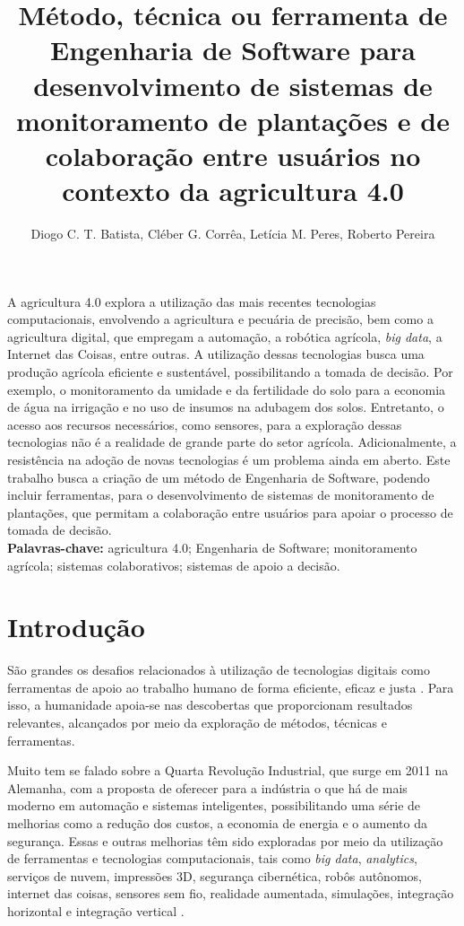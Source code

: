 \documentclass[12pt]{article}
\title{Método, técnica ou ferramenta de Engenharia de Software para desenvolvimento de sistemas de monitoramento de plantações e de colaboração entre usuários no contexto da agricultura 4.0}
\author{Diogo C. T. Batista\inst{1}, Cléber G. Corrêa\inst{2}, Letícia M. Peres\inst{1}, Roberto Pereira\inst{1}}
\begin{document}
 

\maketitle
     
\begin{resumo} 
A agricultura 4.0 explora a utilização das mais recentes tecnologias computacionais, envolvendo a agricultura e pecuária de precisão, bem como a agricultura digital, que empregam a automação, a robótica agrícola, \textit{big data}, a Internet das Coisas, entre outras. A utilização dessas tecnologias busca uma produção agrícola eficiente e sustentável, possibilitando a tomada de decisão. Por exemplo, o monitoramento da umidade e da fertilidade do solo para a economia de água na irrigação e no uso de insumos na adubagem dos solos. Entretanto, o acesso aos recursos necessários, como sensores, para a exploração dessas tecnologias não é a realidade de grande parte do setor agrícola. Adicionalmente, a resistência na adoção de novas tecnologias é um problema ainda em aberto. Este trabalho busca a criação de um método de Engenharia de Software, podendo incluir ferramentas, para o desenvolvimento de sistemas de monitoramento de plantações, que permitam a colaboração entre usuários para apoiar o processo de tomada de decisão. \\

\textbf{Palavras-chave:} agricultura 4.0; Engenharia de Software; monitoramento agrícola; sistemas colaborativos; sistemas de apoio a decisão.
\end{resumo}

\section{Introdução}
\label{sec:introducao}

São grandes os desafios relacionados à utilização de tecnologias digitais como ferramentas de apoio ao trabalho humano de forma eficiente, eficaz e justa \cite{Rose:2019}. Para isso, a humanidade apoia-se nas descobertas que proporcionam resultados relevantes, alcançados por meio da exploração de métodos, técnicas e ferramentas.

Muito tem se falado sobre a Quarta Revolução Industrial, que surge em 2011 na Alemanha, com a proposta de oferecer para a indústria o que há de mais moderno em automação e sistemas inteligentes, possibilitando uma série de melhorias como a redução dos custos, a economia de energia e o aumento da segurança. Essas e outras melhorias têm sido exploradas por meio da utilização de ferramentas e tecnologias computacionais, tais como \textit{big data}, \textit{analytics}, serviços de nuvem, impressões 3D, segurança cibernética, robôs autônomos, internet das coisas, sensores sem fio, realidade aumentada, simulações, integração horizontal e integração vertical \cite{Souza:2017}.
\end{document}
